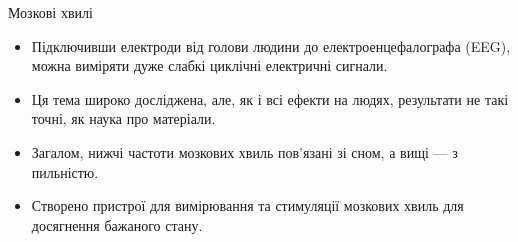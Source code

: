 {\Large Мозкові хвилі}
\begin{itemize}
\item Підключивши електроди від голови людини до електроенцефалографа (EEG), можна виміряти дуже слабкі циклічні електричні сигнали.
\item Ця тема широко досліджена, але, як і всі ефекти на людях, результати не такі точні, як наука про матеріали.
\item Загалом, нижчі частоти мозкових хвиль пов'язані зі сном, а вищі --- з пильністю.
\item Створено пристрої для вимірювання та стимуляції мозкових хвиль для досягнення бажаного стану.
\end{itemize}
